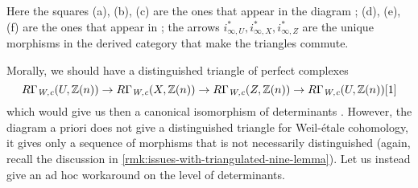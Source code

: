 Here the squares (a), (b), (c) are the ones that appear in the diagram
; (d), (e), (f) are the ones
that appear in ; the arrows
$i_{\infty,U}^*, i_{\infty,X}^*, i_{\infty,Z}^*$ are the unique morphisms in the
derived category that make the triangles commute.

Morally, we should have a distinguished triangle of perfect complexes
\[ R\Gamma_\text{\it W,c} (U,\mathbb{Z}(n)) \to
  R\Gamma_\text{\it W,c} (X,\mathbb{Z}(n)) \to
  R\Gamma_\text{\it W,c} (Z,\mathbb{Z}(n)) \to
  R\Gamma_\text{\it W,c} (U,\mathbb{Z}(n)) [1] \]
which would give us then a canonical isomorphism of determinants
. However,
the diagram  a priori does not give
a distinguished triangle for Weil-étale cohomology, it gives only a sequence of
morphisms that is not necessarily distinguished (again, recall the discussion in
\ref{rmk:issues-with-triangulated-nine-lemma}). Let us instead give an ad hoc
workaround on the level of determinants.

